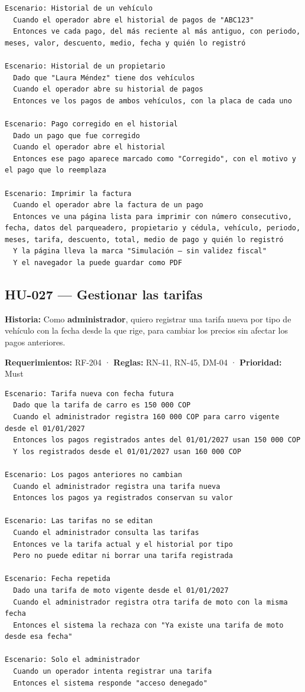 \begin{lstlisting}[style=gherkin]
Escenario: Historial de un vehículo
  Cuando el operador abre el historial de pagos de "ABC123"
  Entonces ve cada pago, del más reciente al más antiguo, con periodo, meses, valor, descuento, medio, fecha y quién lo registró

Escenario: Historial de un propietario
  Dado que "Laura Méndez" tiene dos vehículos
  Cuando el operador abre su historial de pagos
  Entonces ve los pagos de ambos vehículos, con la placa de cada uno

Escenario: Pago corregido en el historial
  Dado un pago que fue corregido
  Cuando el operador abre el historial
  Entonces ese pago aparece marcado como "Corregido", con el motivo y el pago que lo reemplaza

Escenario: Imprimir la factura
  Cuando el operador abre la factura de un pago
  Entonces ve una página lista para imprimir con número consecutivo, fecha, datos del parqueadero, propietario y cédula, vehículo, periodo, meses, tarifa, descuento, total, medio de pago y quién lo registró
  Y la página lleva la marca "Simulación – sin validez fiscal"
  Y el navegador la puede guardar como PDF
\end{lstlisting}



\subsection{HU-027 — Gestionar las tarifas}

\textbf{Historia:} Como \textbf{administrador}, quiero registrar una tarifa nueva por tipo de vehículo con la fecha desde la que rige, para cambiar los precios sin afectar los pagos anteriores.


\textbf{Requerimientos:} RF-204 · \textbf{Reglas:} RN-41, RN-45, DM-04 · \textbf{Prioridad:} Must


\begin{lstlisting}[style=gherkin]
Escenario: Tarifa nueva con fecha futura
  Dado que la tarifa de carro es 150 000 COP
  Cuando el administrador registra 160 000 COP para carro vigente desde el 01/01/2027
  Entonces los pagos registrados antes del 01/01/2027 usan 150 000 COP
  Y los registrados desde el 01/01/2027 usan 160 000 COP

Escenario: Los pagos anteriores no cambian
  Cuando el administrador registra una tarifa nueva
  Entonces los pagos ya registrados conservan su valor

Escenario: Las tarifas no se editan
  Cuando el administrador consulta las tarifas
  Entonces ve la tarifa actual y el historial por tipo
  Pero no puede editar ni borrar una tarifa registrada

Escenario: Fecha repetida
  Dado una tarifa de moto vigente desde el 01/01/2027
  Cuando el administrador registra otra tarifa de moto con la misma fecha
  Entonces el sistema la rechaza con "Ya existe una tarifa de moto desde esa fecha"

Escenario: Solo el administrador
  Cuando un operador intenta registrar una tarifa
  Entonces el sistema responde "acceso denegado"
\end{lstlisting}



